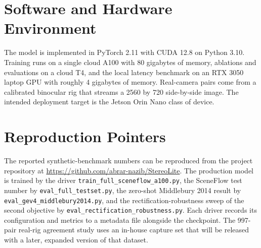 \section{Software and Hardware Environment}
The model is implemented in PyTorch 2.11 with CUDA 12.8 on Python 3.10.
Training runs on a single cloud A100 with 80 gigabytes of memory,
ablations and evaluations on a cloud T4, and the local latency benchmark
on an RTX 3050 laptop GPU with roughly 4 gigabytes of memory. Real-camera
pairs come from a calibrated binocular rig that streams a 2560 by 720
side-by-side image. The intended deployment target is the Jetson Orin Nano
class of device.

\section{Reproduction Pointers}
\begin{sloppypar}
The reported synthetic-benchmark numbers can be reproduced from the
project repository at \url{https://github.com/abrar-nazib/StereoLite}.
The production model is trained by the driver
\texttt{train\_full\_sceneflow\_a100.py}, the SceneFlow test number by
\texttt{eval\_full\_testset.py}, the zero-shot Middlebury 2014 result by
\texttt{eval\_gev4\_middlebury2014.py}, and the rectification-robustness
sweep of the second objective by
\texttt{eval\_rectification\_robustness.py}. Each driver records its
configuration and metrics to a metadata file alongside the checkpoint.
The 997-pair real-rig agreement study uses an in-house capture set that
will be released with a later, expanded version of that dataset.
\end{sloppypar}
